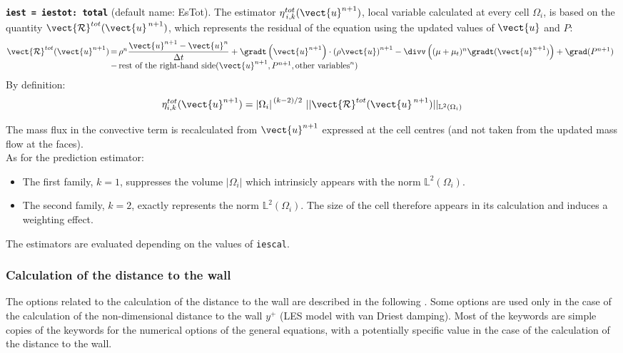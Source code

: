 {\tt \bf iest = iestot: total} (default name: EsTot).
The estimator $ \eta^{tot}_{\,i,k}(\vect{u}^{n+1})$, local variable
calculated at every cell $\Omega_i$, is based on the quantity
$\vect{\mathcal R}^{tot}(\vect{u}^{\,n+1})$, which represents the
residual of the equation using the updated values of
$\vect{u}$ and $P$:
\begin{equation*}
\begin{array}{@{}r@{\,} c@{\,} l}
\vect{\mathcal{R}}^{tot}({\vect{u}^{n+1}})&= & \rho^n
    \dfrac{{\vect{u}^{n+1}}-\vect{u}^n}{\Delta t}
  + \gradt \left({\vect{u}^{n+1}} \right) \cdot {\left(\rho  \vect{u}\right)}^{n+1}
              - \divv \left((\mu+\mu_t)^n \gradt({\vect{u}^{n+1}}) \right)
              + \grad({P^{n+1}})     \\
              &- &\text{rest of the right-hand side}
                        ({\vect{u}^{n+1}}, {P^{n+1}}, \text{other variables}^n)
\end{array}
\end{equation*}
%
By definition:
$$ \eta^{tot}_{i,k}(\vect{u}^{n+1})= {|\Omega_i|}^{\,(k-2)/2}\ ||\vect{\mathcal R}^{tot}(\vect{u}^{\,n+1})||
_{\mathbb{L}^{2}(\Omega_i)}$$

The mass flux in the convective term is recalculated from $\vect{u}^{n+1}$
expressed at the cell centres (and not taken from the updated mass flow at the
faces).\\

As for the prediction estimator:
\begin{itemize}
\item The first family, $k=1$, suppresses the
volume $|\Omega_i|$ which intrinsicly appears  with the norm
${\mathbb{L}^{2}(\Omega_i)}$.
\item The second family, $k=2$, exactly represents the norm
${\mathbb{L}^{2}(\Omega_i)}$. The size of the cell therefore
appears in its calculation and induces a weighting effect.
\end{itemize}

The estimators are evaluated depending on the values of {\tt iescal}.

\subsubsection{Calculation of the distance to the wall}

The options related to the calculation of the distance to the wall are described in
the following .
Some options are used only in the case of the calculation of the non-dimensional distance
to the wall $y^+$ (LES model with van Driest damping). Most of the keywords are simple copies of the
keywords for the numerical options of the general equations, with a potentially
specific value in the case of the calculation of the distance to the wall.\\


